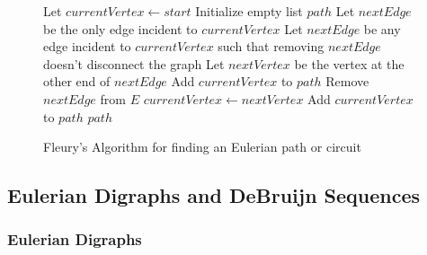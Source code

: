 \documentclass{article}
\theoremstyle{definition}
\begin{document}
\begin{figure}[p]
\vspace{1em}
\begin{minipage}{\linewidth}
\begin{algorithm}[H]
\caption{Fleury's Algorithm for finding an Eulerian path or circuit}
\begin{algorithmic}[1]
    \State Let $currentVertex \gets start$
    \State Initialize empty list $path$
            \State Let $nextEdge$ be the only edge incident to $currentVertex$
        \Else
            \State Let $nextEdge$ be any edge incident to $currentVertex$ such that removing $nextEdge$ doesn't disconnect the graph
        \EndIf
        \State Let $nextVertex$ be the vertex at the other end of $nextEdge$
        \State Add $currentVertex$ to $path$
        \State Remove $nextEdge$ from $E$
        \State $currentVertex \gets nextVertex$
    \EndWhile
    \State Add $currentVertex$ to $path$ 
    \State \Return $path$
\EndProcedure
\end{algorithmic}
\end{algorithm}
\end{minipage}
\end{figure}

\pagebreak

\subsection{Eulerian Digraphs and DeBruijn Sequences}
\subsubsection{Eulerian Digraphs}
\end{document}

